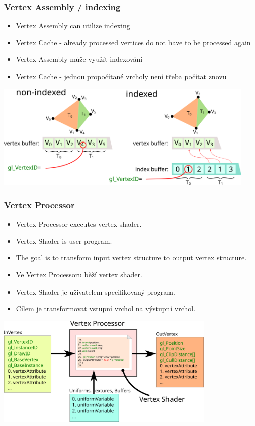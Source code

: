 \begin{frame}
\frametitle{Vertex Assembly / indexing}
  \scriptsize
	\begin{itemize}
		\item Vertex Assembly can utilize indexing
    \item Vertex Cache - already processed vertices do not have to be processed again
	\end{itemize}
	\begin{itemize}
		\item Vertex Assembly může využít indexování
    \item Vertex Cache - jednou propočítané vrcholy není třeba počítat znovu
	\end{itemize}
	\includegraphics[width=12.5cm,keepaspectratio]{pics/pipeline/drawElements}
\end{frame}

\begin{frame}
\frametitle{Vertex Processor}
  \scriptsize
	\begin{itemize}
		\item Vertex Processor executes vertex shader.
    \item Vertex Shader is user program.
    \item The goal is to transform input vertex structure to output vertex structure.
	\end{itemize}

	\begin{itemize}
		\item Ve Vertex Processoru běží vertex shader.
    \item Vertex Shader je uživatelem specifikovaný program.
    \item Cílem je transformovat vstupní vrchol na výstupní vrchol.
	\end{itemize}
	\includegraphics[width=10.5cm,keepaspectratio]{pics/pipeline/vertexShader}
\end{frame}

